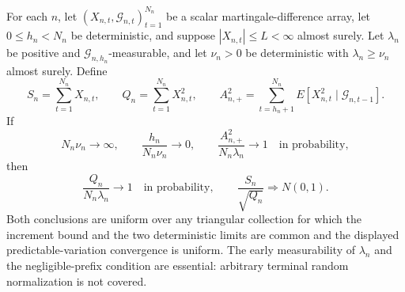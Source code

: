 For each \(n\), let \((X_{n,t},\mathcal G_{n,t})_{t=1}^{N_n}\) be a scalar martingale-difference array, let \(0\le h_n<N_n\) be deterministic, and suppose \(|X_{n,t}|\le L<\infty\) almost surely. Let \(\lambda_n\) be positive and \(\mathcal G_{n,h_n}\)-measurable, and let \(\nu_n>0\) be deterministic with \(\lambda_n\ge\nu_n\) almost surely. Define
\[
 S_n=\sum_{t=1}^{N_n}X_{n,t},\qquad
 Q_n=\sum_{t=1}^{N_n}X_{n,t}^2,\qquad
 A_{n,+}^2=\sum_{t=h_n+1}^{N_n}E[X_{n,t}^2\mid\mathcal G_{n,t-1}].
\]
If
\[
 N_n\nu_n\longrightarrow\infty,\qquad
 \frac{h_n}{N_n\nu_n}\longrightarrow0,\qquad
 \frac{A_{n,+}^2}{N_n\lambda_n}\longrightarrow1
 \quad\text{in probability},
\]
then
\[
 \frac{Q_n}{N_n\lambda_n}\longrightarrow1
 \quad\text{in probability},\qquad
 \frac{S_n}{\sqrt{Q_n}}\Rightarrow N(0,1).
\]
Both conclusions are uniform over any triangular collection for which the increment bound and the two deterministic limits are common and the displayed predictable-variation convergence is uniform. The early measurability of \(\lambda_n\) and the negligible-prefix condition are essential: arbitrary terminal random normalization is not covered.